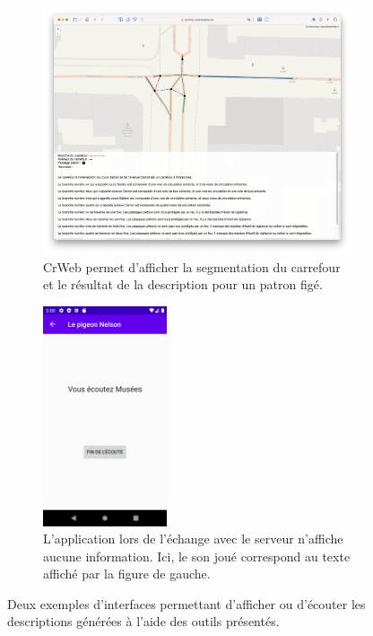 \begin{figure}[ht]
    \centering
    \begin{subfigure}[t]{.49\linewidth}
        \centering
        \includegraphics[width=\textwidth]{images/experimentation/crweb.png}
        \caption{CrWeb permet d'afficher la segmentation du carrefour et le résultat de la description pour un patron figé.}
        \label{fig:experimentation_crweb}
    \end{subfigure}
    \begin{subfigure}[t]{.49\linewidth}
        \centering
        \includegraphics[width=0.4\textwidth]{images/experimentation/pigeonnelson.png}
        \caption{L'application lors de l'échange avec le serveur n'affiche aucune information. Ici, le son joué correspond au texte affiché par la figure de gauche.}
        \label{fig:experimentation_pigeonnelson}
    \end{subfigure}
    \caption{Deux exemples d'interfaces permettant d'afficher ou d'écouter les descriptions générées à l'aide des outils présentés.}
    \label{fig:experimentation_crweb_pigeon}
\end{figure}

